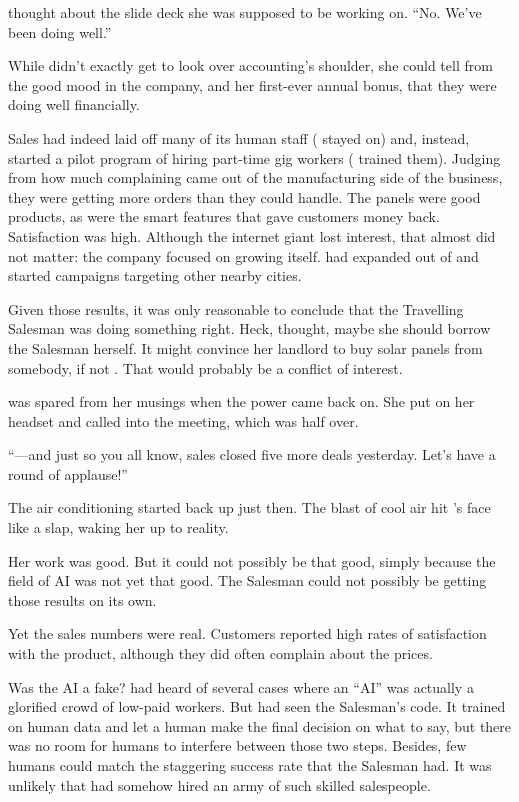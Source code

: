 {\protag} thought about the slide deck she was supposed to be working on. ``No. We’ve been doing well.''

While {\protag} didn’t exactly get to look over accounting's shoulder, she could tell from the good mood in the company, and her first-ever annual bonus, that they were doing well financially.

Sales had indeed laid off many of its human staff (\energyJerk{} stayed on) and, instead, started a pilot program of hiring part-time gig workers (\energyJerk{} trained them). Judging from how much complaining came out of the manufacturing side of the business, they were getting more orders than they could handle. The panels were good products, as were the smart features that gave customers money back. Satisfaction was high. Although the internet giant lost interest, that almost did not matter: the company focused on growing itself. \energyCompany{} had expanded out of \crunchyCity{} and started campaigns targeting other nearby cities.

Given those results, it was only reasonable to conclude that the Travelling Salesman was doing something right. Heck, {\protag} thought, maybe she should borrow the Salesman herself. It might convince her landlord to buy solar panels from somebody, if not \energyCompany{}. That would probably be a conflict of interest.

{\protag} was spared from her musings when the power came back on. She put on her headset and called into the meeting, which was half over.

``---and just so you all know, sales closed five more deals yesterday. Let's have a round of applause!''

The air conditioning started back up just then. The blast of cool air hit {\protag}'s face like a slap, waking her up to reality.

Her work was good. But it could not possibly be that good, simply because the field of AI was not yet that good. The Salesman could not possibly be getting those results on its own.

Yet the sales numbers were real. Customers reported high rates of satisfaction with the product, although they did often complain about the prices.

Was the AI a fake? {\protag} had heard of several cases where an ``AI'' was actually a glorified crowd of low-paid workers. But {\protag} had seen the Salesman's code. It trained on human data and let a human make the final decision on what to say, but there was no room for humans to interfere between those two steps. Besides, few humans could match the staggering success rate that the Salesman had. It was unlikely that \energyCompany{} had somehow hired an army of such skilled salespeople.

